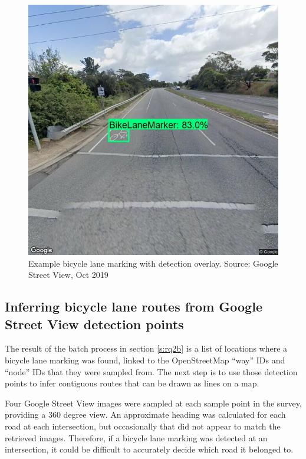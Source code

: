 \documentclass[11pt,twoside]{report}
\begin{document}
\begin{figure}[h!]
\centering
\includegraphics[scale=0.2]{f004_gsv_detection_example.jpg}
\caption{Example bicycle lane marking with detection overlay.  Source: Google Street View, Oct 2019}
\label{fig:004}
\end{figure}


\subsection{Inferring bicycle lane routes from Google Street View detection points}
\label{s:rq2c}

The result of the batch process in section \ref{s:rq2b} is a list of locations where a bicycle lane marking was found, linked to the OpenStreetMap ``way'' IDs and ``node'' IDs that they were sampled from.  The next step is to use those detection points to infer contiguous routes that can be drawn as lines on a map.

Four Google Street View images were sampled at each sample point in the survey, providing a 360 degree view.  An approximate heading was calculated for each road at each intersection, but occasionally that did not appear to match the retrieved images.  Therefore, if a bicycle lane marking was detected at an intersection, it could be difficult to accurately decide which road it belonged to.
\end{document}
